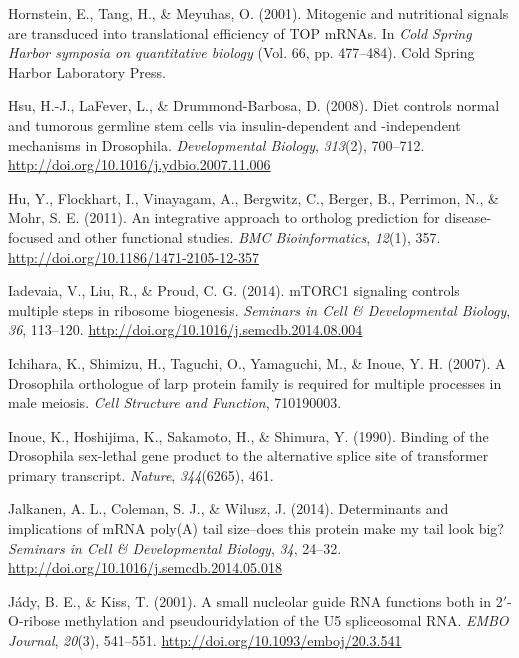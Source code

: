 \documentclass[12pt,twoside]{reedthesis}
\newlength{\cslhangindent}
\newenvironment{cslreferences}%
  {\setlength{\parindent}{0pt}%
  \everypar{\setlength{\hangindent}{\cslhangindent}}\ignorespaces}%
  {\par}
\begin{document}
\begin{cslreferences}
\leavevmode\hypertarget{ref-Hornstein2001a}{}%
Hornstein, E., Tang, H., \& Meyuhas, O. (2001). Mitogenic and nutritional signals are transduced into translational efficiency of TOP mRNAs. In \emph{Cold Spring Harbor symposia on quantitative biology} (Vol. 66, pp. 477--484). Cold Spring Harbor Laboratory Press.

\leavevmode\hypertarget{ref-hsuDietControlsNormal2008}{}%
Hsu, H.-J., LaFever, L., \& Drummond-Barbosa, D. (2008). Diet controls normal and tumorous germline stem cells via insulin-dependent and -independent mechanisms in Drosophila. \emph{Developmental Biology}, \emph{313}(2), 700--712. \url{http://doi.org/10.1016/j.ydbio.2007.11.006}

\leavevmode\hypertarget{ref-huIntegrativeApproachOrtholog2011}{}%
Hu, Y., Flockhart, I., Vinayagam, A., Bergwitz, C., Berger, B., Perrimon, N., \& Mohr, S. E. (2011). An integrative approach to ortholog prediction for disease-focused and other functional studies. \emph{BMC Bioinformatics}, \emph{12}(1), 357. \url{http://doi.org/10.1186/1471-2105-12-357}

\leavevmode\hypertarget{ref-iadevaiaMTORC1SignalingControls2014}{}%
Iadevaia, V., Liu, R., \& Proud, C. G. (2014). mTORC1 signaling controls multiple steps in ribosome biogenesis. \emph{Seminars in Cell \& Developmental Biology}, \emph{36}, 113--120. \url{http://doi.org/10.1016/j.semcdb.2014.08.004}

\leavevmode\hypertarget{ref-Ichihara2007a}{}%
Ichihara, K., Shimizu, H., Taguchi, O., Yamaguchi, M., \& Inoue, Y. H. (2007). A Drosophila orthologue of larp protein family is required for multiple processes in male meiosis. \emph{Cell Structure and Function}, 710190003.

\leavevmode\hypertarget{ref-Inoue1990}{}%
Inoue, K., Hoshijima, K., Sakamoto, H., \& Shimura, Y. (1990). Binding of the Drosophila sex-lethal gene product to the alternative splice site of transformer primary transcript. \emph{Nature}, \emph{344}(6265), 461.

\leavevmode\hypertarget{ref-Jalkanen2014h}{}%
Jalkanen, A. L., Coleman, S. J., \& Wilusz, J. (2014). Determinants and implications of mRNA poly(A) tail size--does this protein make my tail look big? \emph{Seminars in Cell \& Developmental Biology}, \emph{34}, 24--32. \url{http://doi.org/10.1016/j.semcdb.2014.05.018}

\leavevmode\hypertarget{ref-Jady2001c}{}%
Jády, B. E., \& Kiss, T. (2001). A small nucleolar guide RNA functions both in 2\({'}\)-O-ribose methylation and pseudouridylation of the U5 spliceosomal RNA. \emph{EMBO Journal}, \emph{20}(3), 541--551. \url{http://doi.org/10.1093/emboj/20.3.541}


\end{cslreferences}
\end{document}
